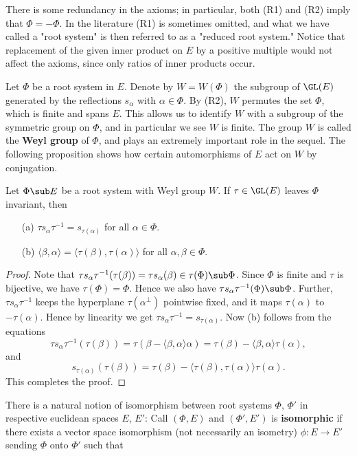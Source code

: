 There is some redundancy in the axioms; in particular, both (R1) and (R2) imply that $\Phi=-\Phi$. In the literature (R1) is sometimes omitted, and what we have called a "root system" is then referred to as a "reduced root system." Notice that replacement of the given inner product on $E$ by a positive multiple would not affect the axioms, since only ratios of inner products occur.\par
Let $\Phi$ be a root system in $E$. Denote by $W=W(\Phi)$ the subgroup of $\GL(E)$ generated by the reflections $s_\alpha$ with $\alpha\in\Phi$. By (R2), $W$ permutes the set $\Phi$, which is finite and spans $E$. This allows us to identify $W$ with a subgroup of the symmetric group on $\Phi$, and in particular we see $W$ is finite. The group $W$ is called the \textbf{Weyl group} of $\Phi$, and plays an extremely important role in the sequel. The following proposition shows how certain automorphisms of $E$ act on $W$ by conjugation.
\begin{proposition}\label{root system invariant transform prop}
Let $\Phi\sub E$ be a root system with Weyl group $W$. If $\tau\in\GL(E)$ leaves $\Phi$ invariant, then
\begin{itemize}
\item[(a)] $\tau s_\alpha\tau^{-1}=s_{\tau(\alpha)}$ for all $\alpha\in\Phi$.
\item[(b)] $\langle\beta,\alpha\rangle=\langle\tau(\beta),\tau(\alpha)\rangle$ for all $\alpha,\beta\in\Phi$.
\end{itemize}
\end{proposition}
\begin{proof}
Note that $\tau s_\alpha\tau^{-1}(\tau(\beta))=\tau s_\alpha(\beta)\in\tau(\Phi)\sub\Phi$. Since $\Phi$ is finite and $\tau$ is bijective, we have $\tau(\Phi)=\Phi$. Hence we also have $\tau s_\alpha\tau^{-1}(\Phi)\sub\Phi$. Further, $\tau s_\alpha\tau^{-1}$ keeps the hyperplane $\tau(\alpha^\bot)$ pointwise fixed, and it maps $\tau(\alpha)$ to $-\tau(\alpha)$. Hence by linearity we get $\tau s_\alpha\tau^{-1}=s_{\tau(\alpha)}$. Now (b) follows from the equations
\[\tau s_\alpha\tau^{-1}(\tau(\beta))=\tau(\beta-\langle\beta,\alpha\rangle\alpha)=\tau(\beta)-\langle\beta,\alpha\rangle\tau(\alpha),\]
and
\[s_{\tau(\alpha)}(\tau(\beta))=\tau(\beta)-\langle\tau(\beta),\tau(\alpha)\rangle\tau(\alpha).\]
This completes the proof.
\end{proof}
There is a natural notion of isomorphism between root systems $\Phi$, $\Phi'$ in respective euclidean spaces $E$, $E'$: Call $(\Phi,E)$ and $(\Phi',E')$ is \textbf{isomorphic} if there exists a vector space isomorphism (not necessarily an isometry) $\phi:E\to E'$ sending $\Phi$ onto $\Phi'$ such that
